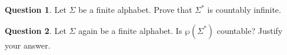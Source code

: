 \documentclass{article}
\theoremstyle{definition}
\newtheorem{Q}{Question}
\newcommand{\bbN}{\mathbb{N}}
\begin{document}
\begin{Q}
Let $\Sigma$ be a finite alphabet. Prove that $\Sigma^*$ is countably infinite. 
\end{Q}
\begin{comment}
\textbf{Solution}
$\Sigma^*$ is the set of all finite strings using $\Sigma$, so is obviously infinite. To prove it is countable it is sufficient to find a 1-1 function $f:\Sigma^*\to \bbN$. We construct an example of a function like this. Suppose $\Sigma = \{\sigma_1,\ldots,\sigma_n\}$. Let $p_1,p_2,p_3,\ldots$ list the prime numbers in ascending order. Given a string $s = \sigma_{i_1}\sigma_{i_2}\ldots\sigma_{i_k}$, define $f(s) = p_1^{i_1}\times p_2^{i_2}\times \ldots \times p_k^{i_k}$. 

So, for example, if the alphabet is $\{ a = \sigma_0, b = \sigma_1, c=\sigma_2\}$, the string $aacb$ corresponds to $2^13^15^37^2$. I.e., the letter $a$ is at positions 1 and 2 (corresponding to $p_1 = 2$ and $p_2 = 3$, the 1st and 2nd primes), the letter $c$ is at position 3, and the letter $b$ is at position 4. 

Then $f$ is 1-1 because, by the Fundamental Theorem of Arithmetic, numbers are specified uniquely by their prime factorizations (up to reordering).
\end{comment}

\begin{Q}
Let $\Sigma$ again be a finite alphabet. Is $\wp(\Sigma^*)$ countable? Justify your answer.
\end{Q}
\begin{comment}
\textbf{Solution}
This must be uncountable so long as $\Sigma$ is non-empty, because, as proved in the notes for the 531 course, given a non-empty set $X$ we always have $|X|<|\wp(X)|$. 
\end{comment}
\end{document}
